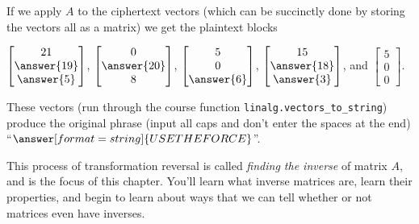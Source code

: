 \documentclass{ximera}
\begin{document}
\begin{example}
  If we apply $A$ to the ciphertext vectors (which can be succinctly done by storing the vectors all as a matrix) we get the plaintext blocks 

  $\begin{bmatrix}
    21 \\
    \answer{19}\\
    \answer{5}\end{bmatrix}$, 
    $\begin{bmatrix}
    0 \\
    \answer{20}
    \\8\end{bmatrix}$, 
    $\begin{bmatrix}
    5\\0\\
    \answer{6}\end{bmatrix}$, 
    $\begin{bmatrix}
    15\\
    \answer{18}\\
    \answer{3}\end{bmatrix}$, 
    and $\begin{bmatrix}
    5\\0\\0\end{bmatrix}$.

  These vectors (run through the course function \texttt{linalg.vectors\_to\_string}) produce the original phrase (input all caps and don't enter the spaces at the end) ``$\answer[format=string]{USE THE FORCE}$''.

\end{example}

This process of transformation reversal is called \emph{finding the inverse} of matrix $A$, and is the focus of this chapter. You'll learn what inverse matrices are, learn their properties, and begin to learn about ways that we can tell whether or not matrices even have inverses.
\end{document}

